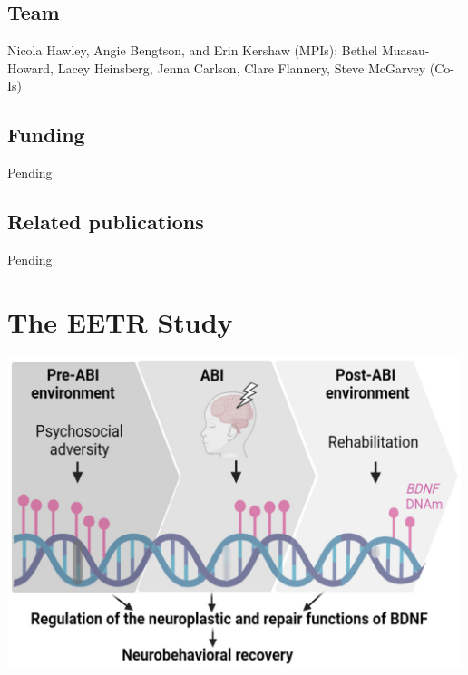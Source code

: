 \documentclass[
  letterpaper,
  DIV=11,
  numbers=noendperiod]{scrreprt}
\begin{document}
\section*{Team}\label{team-2}


Nicola Hawley, Angie Bengtson, and Erin Kershaw (MPIs); Bethel
Muasau-Howard, Lacey Heinsberg, Jenna Carlson, Clare Flannery, Steve
McGarvey (Co-Is)

\section*{Funding}\label{funding-2}


Pending

\section*{Related publications}\label{related-publications-2}


Pending


\chapter*{The EETR Study}\label{the-eetr-study}


\begin{center}
\includegraphics[width=5.20833in,height=\textheight]{eetr.png}
\end{center}
\end{document}
